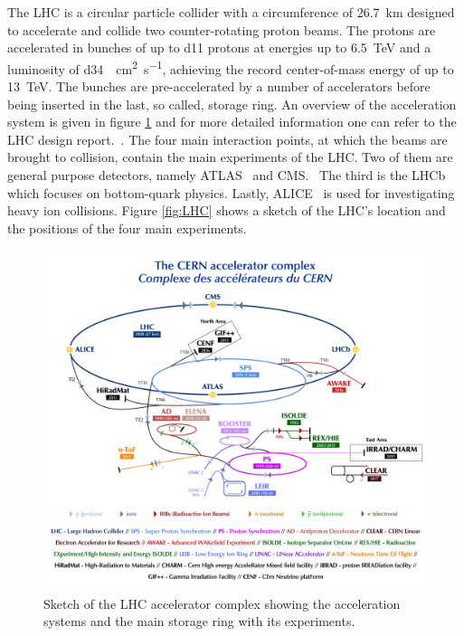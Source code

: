The LHC is a circular particle collider with a circumference of \SI{26.7}{\kilo \metre} designed to  accelerate and collide two counter-rotating proton beams. The protons are accelerated in bunches of up to \num{d11} protons at  energies up to \SI{6.5}{\tera \electronvolt} and a luminosity of \SI{d34}{\per\square\cm \per\s}, achieving the record center-of-mass energy of up to \SI{13}{\tera \electronvolt}. The bunches are pre-accelerated by a number of accelerators before being inserted in the last, so called, storage ring. An overview of the acceleration system is given in figure \ref{fig:accelerator_complex} and for more detailed information one can refer to the LHC design report.~\cite{lhc_machine}. 
The four main interaction points, at which the beams are brought to collision, contain the main experiments of the LHC. Two of them are general purpose detectors, namely ATLAS~\cite{atlas} and CMS.~\cite{cms} The third is the LHCb~\cite{lhcb} which focuses on bottom-quark physics. Lastly, ALICE~\cite{alice} is used for investigating heavy ion collisions. Figure \ref{fig:LHC} shows a sketch of the LHC's location and the positions of the four main experiments.

\begin{figure}[htbp]
\centering
\includegraphics[width=\figwidth]{figures_LHC/CCC-v2018-print-v2.jpg}
\caption[Sketch of the LHC accelerator complex]{Sketch of the LHC accelerator complex showing the acceleration systems and the main storage ring with its experiments.~\cite{Mobs:2636343}}
\label{fig:accelerator_complex}
\end{figure}


